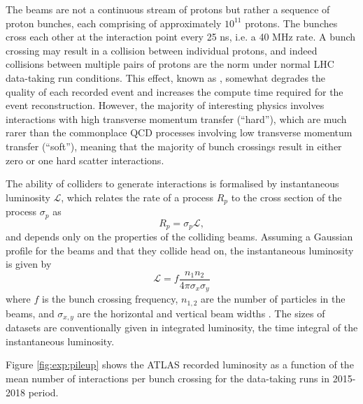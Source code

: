 The beams are not a continuous stream of protons but rather a sequence of
proton bunches, each comprising of approximately $10^{11}$ protons. The
bunches cross each other at the interaction point every 25 ns, i.e. a
40 MHz rate. A bunch crossing may result in a collision between
individual protons, and indeed collisions between multiple pairs of
protons are the norm under normal LHC data-taking run conditions.
This effect, known as \pileup, somewhat degrades the quality of
each recorded event and increases the compute time required for the
event reconstruction. However, the majority of interesting physics
involves interactions with high transverse momentum transfer (``hard''),
which are much rarer than the commonplace QCD processes involving
low transverse momentum transfer (``soft''), meaning that the majority
of bunch crossings result in either zero or one hard scatter interactions.

The ability of colliders to generate interactions is formalised by
instantaneous luminosity $\mathcal{L}$, which relates the rate of a process $R_p$
to the cross section of the process $\sigma_p$ as
\begin{equation}
R_p = \sigma_p \mathcal{L},
\end{equation}
and depends only on the properties of the colliding beams. Assuming a
Gaussian profile for the beams and that they collide head on, the
instantaneous luminosity is given by
\begin{equation}
\mathcal{L} = f \frac{n_1 n_2 }{4 \pi \sigma_x \sigma_y}
\end{equation}
where $f$ is the bunch crossing frequency, $n_{1, 2}$ are the number of
particles in the beams, and $\sigma_{x,y}$ are the horizontal and vertical
beam widths \cite{Thomson:2013zua}. The sizes of datasets are conventionally
given in integrated luminosity, the time integral of the instantaneous
luminosity.

Figure \ref{fig:exp:pileup} shows the ATLAS recorded luminosity as a
function of the mean number of interactions per bunch crossing for
the data-taking runs in 2015-2018 period.


